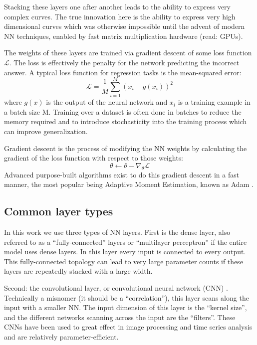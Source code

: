 Stacking these layers one after another leads to the ability to express very complex curves. The true innovation here is the ability to express very high dimensional curves which was otherwise impossible until the advent of modern NN techniques, enabled by fast matrix multiplication hardware (read: GPUs).

The weights of these layers are trained via gradient descent of some loss function $\mathcal{L}$. The loss is effectively the penalty for the network predicting the incorrect answer. A typical loss function for regression tasks is the mean-squared error: 
\begin{equation}
	\mathcal{L} = \frac{1}{M} \sum_{i=1}^M (x_i - g(x_i))^2
\end{equation}
where $g(x)$ is the output of the neural network and $x_i$ is a training example in a batch size M. Training over a dataset is often done in batches to reduce the memory required and to introduce stochasticity into the training process which can improve generalization. 

Gradient descent is the process of modifying the NN weights by calculating the gradient of the loss function with respect to those weights:
\begin{equation}
	\theta \gets \theta - \nabla_\theta \mathcal{L}
\end{equation}
Advanced purpose-built algorithms exist to do this gradient descent in a fast manner, the most popular being Adaptive Moment Estimation, known as Adam  \cite{kingma_adam_2017}. 


\subsection{Common layer types}

In this work we use three types of NN layers. First is the dense layer, also referred to as a ``fully-connected'' layers or ``multilayer perceptron'' if the entire model uses dense layers. In this layer every input is connected to every output. This fully-connected topology can lead to very large parameter counts if these layers are repeatedly stacked with a large width.

Second: the convolutional layer, or convolutional neural network (CNN) \cite{lecun_convolutional_1995}. Technically a misnomer (it should be a ``correlation''), this layer scans along the input with a smaller NN. The input dimension of this layer is the ``kernel size'', and the different networks scanning across the input are the ``filters''. These CNNs have been used to great effect in image processing and time series analysis and are relatively parameter-efficient.

